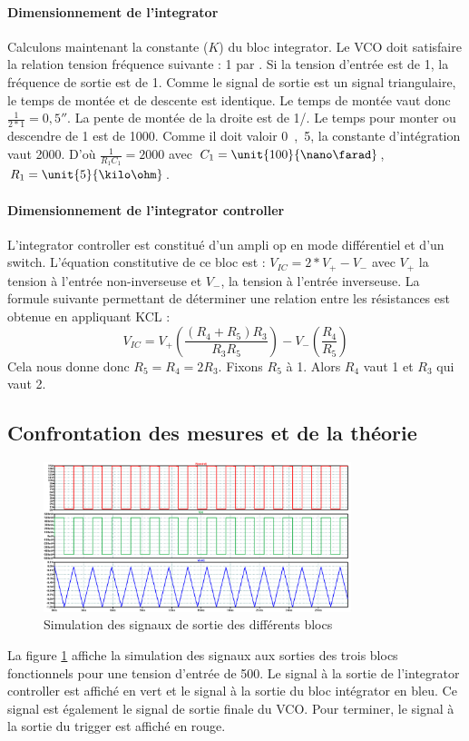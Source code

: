 \paragraph{Dimensionnement de l'integrator}
Calculons maintenant la constante ($K$) du bloc integrator. Le VCO doit satisfaire la relation tension fréquence suivante : \unit{1}{\milli\volt} par \unit{}{\hertz}. Si la tension d'entrée est de \unit{1}{\milli\volt}, la fréquence de sortie est de \unit{1}{\hertz}. Comme le signal de sortie est un signal triangulaire, le temps de montée et de descente est identique. Le temps de montée vaut donc $\frac{1}{2*1} =  \unit{0,5}{\second}$. La pente de montée de la droite est de \unit{1}{\milli\volt}/\unit{}{\second}. Le temps pour monter ou descendre de \unit{1}{\volt} est de \unit{1000}{\second}. Comme il doit valoir \unit{0,5}{\second}, la constante d'intégration vaut 2000. D'où $\frac{1}{R_1C_1}=2000$ avec $C_1= \unit{100}{\nano\farad}$, $R_1 = \unit{5}{\kilo\ohm}$.
\paragraph{Dimensionnement de l'integrator controller}
L'integrator controller est constitué d'un ampli op en mode différentiel et d'un switch. L'équation constitutive de ce bloc est : $V_{IC}=2*V_+ - V_-$ avec $V_+$ la tension à l'entrée non-inverseuse et $V_-$, la tension à l'entrée inverseuse. La formule suivante permettant de déterminer une relation entre les résistances est obtenue en appliquant KCL : $$V_{IC}=V_+ \left(\frac{\left(R_4 + R_5\right)R_3}{R_3R_5}\right)-V_-\left(\frac{R_4}{R_5}\right)$$ Cela nous donne donc $R_5 = R_4 = 2R_3$.
Fixons $R_5$ à \unit{1}{\kilo\ohm}. Alors $R_4$ vaut \unit{1}{\kilo\ohm} et $R_3$ qui vaut \unit{2}{\kilo\ohm}.

\subsection{Confrontation  des mesures et de la théorie}
\begin{figure}[ht]
	\centering
	\includegraphics[width=0.8\textwidth]{img-vco/vco_response.png}
	\caption{Simulation des signaux de sortie des différents blocs}
	\label{fig:out_vco_th}
\end{figure}
La figure \ref{fig:out_vco_th} affiche la simulation des signaux aux sorties des trois blocs fonctionnels pour une tension d'entrée de \unit{500}{\milli\volt}. Le signal à la sortie de l'integrator controller est affiché en vert et le signal à la sortie du bloc intégrator en bleu. Ce signal est également le signal de sortie finale du VCO. Pour terminer, le signal à la sortie du trigger est affiché en rouge.

